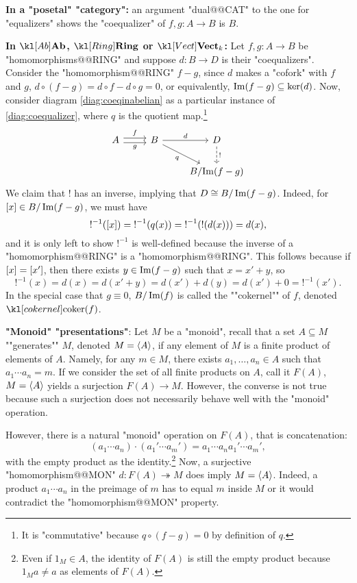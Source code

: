 \documentclass[main.tex]{subfiles}
\begin{document}
\begin{exmps}
    \textbf{In a "posetal" "category":} an argument "dual@@CAT" to the one for "equalizers" shows the "coequalizer" of $f,g:A \rightarrow B$ is $B$.

    \textbf{In $\catAb$, $\catRing$ or $\catVect{k}$:} Let $f,g: A \rightarrow B$ be "homomorphisms@@RING" and suppose $d:B \rightarrow D$ is their "coequalizers". Consider the "homomorphism@@RING" $f-g$, since $d$ makes a "cofork" with $f$ and $g$, $d \circ (f-g) = d\circ f - d \circ g= 0$, or equivalently, $\operatorname{Im}(f-g) \subseteq \ker(d)$. Now, consider diagram \eqref{diag:coeqinabelian} as a particular instance of \eqref{diag:coequalizer}, where $q$ is the quotient map.\footnote{It is "commutative" because $q\circ (f-g) = 0$ by definition of $q$.}
    \begin{equation}\label{diag:coeqinabelian}
        \begin{tikzcd}
            A \arrow[r, "f", shift left] \arrow[r, "g"', shift right] & B \arrow[r, "d"] \arrow[rd, "q"'] & D \arrow[d, "!", dashed] \\& & B/{\im(f-g)}
        \end{tikzcd}
    \end{equation}
    We claim that $!$ has an inverse, implying that $D \cong B/\operatorname{Im}(f-g)$. Indeed, for $\left[ x \right] \in B/\operatorname{Im}(f-g)$, we must have 
    \[!^{-1}(\left[ x \right]) = {!}^{-1}(q(x)) = {!}^{-1}(!(d(x)))= d(x),\]
    and it is only left to show $!^{-1}$ is well-defined because the inverse of a "homomorphism@@RING" is a "homomorphism@@RING". This follows because if $\left[ x \right] = \left[ x' \right]$, then there exists $y \in \operatorname{Im}(f-g)$ such that $x = x' + y$, so \[!^{-1}(x) = d(x) = d(x'+y) = d(x') +d(y) = d(x') + 0 = {!}^{-1}(x').\]
    \AP In the special case that $g \equiv 0$, $B/\operatorname{Im}(f)$ is called the ""cokernel"" of $f$, denoted $\coker(f)$.

    \textbf{"Monoid" "presentations"}: Let $M$ be a "monoid", recall that a set $A \subseteq M$ ""generates"" $M$, denoted $M = \left\langle A \right\rangle$, if any element of $M$ is a finite product of elements of $A$. Namely, for any $m \in M$, there exists $a_1,\dots, a_n \in A$ such that $a_1 \cdots a_n = m$. If we consider the set of all finite products on $A$, call it $F(A)$, $M = \left\langle A \right\rangle$ yields a surjection $F(A) \rightarrow M$. However, the converse is not true because such a surjection does not necessarily behave well with the "monoid" operation.

    However, there is a natural "monoid" operation on $F(A)$, that is concatenation: \[(a_1\cdots a_n) \cdot (a_1'\cdots a_m') = a_1\cdots a_na_1'\cdots a_m',\]
    with the empty product as the identity.\footnote{Even if $1_M \in A$, the identity of $F(A)$ is still the empty product because $1_Ma \neq a$ as elements of $F(A)$.} Now, a surjective "homomorphism@@MON" $d: F(A) \twoheadrightarrow M$ does imply $M = \left\langle A \right\rangle$. Indeed, a product $a_1\cdots a_n$ in the preimage of $m$ has to equal $m$ inside $M$ or it would contradict the "homomorphism@@MON" property.


\end{exmps}
\end{document}
